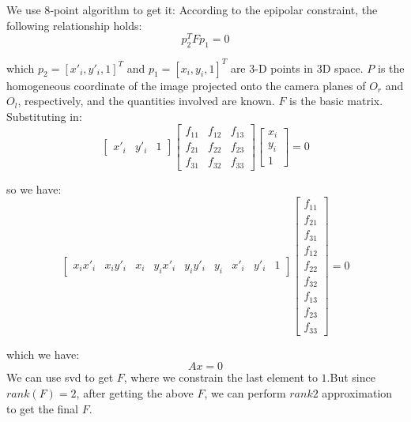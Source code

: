\documentclass[onecolumn,10pt]{article}
\begin{document}
We use 8‐point algorithm to get it:
According to the epipolar constraint, the following relationship holds:
\begin{equation}
    p_2^T F p_1 = 0
\end{equation}

which \( p_2 = [x'_i, y'_i, 1]^T \) and \( p_1 = [x_i, y_i, 1]^T \) are 3-D points in 3D space. \( P \) is the homogeneous coordinate of the image projected onto the camera planes of \( O_r \) and \( O_l \), respectively, and the quantities involved are known. \( F \) is the basic matrix. Substituting in:
\begin{equation}
    \begin{bmatrix} x'_i & y'_i & 1 \end{bmatrix}
    \begin{bmatrix}
        f_{11} & f_{12} & f_{13} \\
        f_{21} & f_{22} & f_{23} \\
        f_{31} & f_{32} & f_{33}
    \end{bmatrix}
    \begin{bmatrix} x_i \\ y_i \\ 1 \end{bmatrix} = 0
\end{equation}

so we have:
\begin{equation}
    \begin{bmatrix}
        x_i x'_i & x_i y'_i & x_i & y_i x'_i & y_i y'_i & y_i & x'_i & y'_i & 1
    \end{bmatrix}
    \begin{bmatrix}
        f_{11} \\ f_{21} \\ f_{31} \\ f_{12} \\ f_{22} \\ f_{32} \\ f_{13} \\ f_{23} \\ f_{33}
    \end{bmatrix} = 0
\end{equation}

which we have:
\begin{equation}
    Ax = 0
\end{equation}
We can use svd to get $F$, where we constrain the last element to $1$.But since $rank(F) = 2$, after getting the above $F$, we can perform $rank2$ approximation to get the final $F$.
\end{document}
